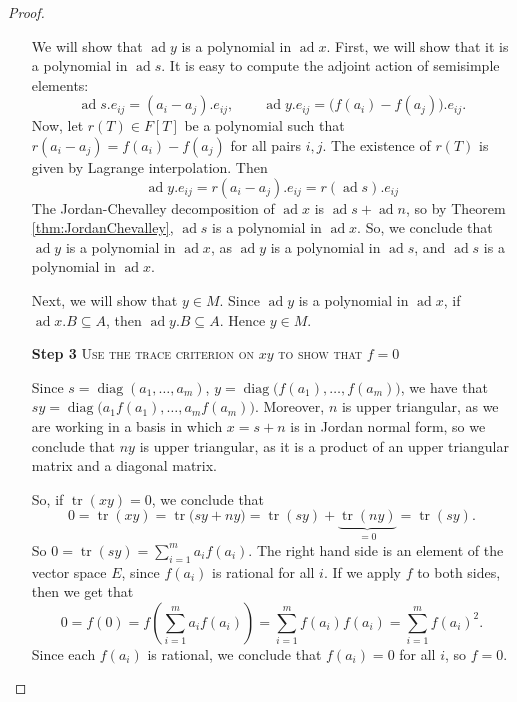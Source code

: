 \documentclass{article}
\DeclareMathOperator{\tr}{tr}
\DeclareMathOperator{\diag}{diag}
\newcommand*\ad{\operatorname{ad}}
\newcommand*\acts{.}
\begin{document}
\begin{proof}
\begin{itemize}
            We will show that $\ad y$ is a polynomial in $\ad x$.
            First, we will show that it is a polynomial in $\ad s$.
            It is easy to compute the adjoint action of semisimple elements:
            \[
                \ad s \acts e_{ij}
                =
                (a_i - a_j) \acts e_{ij}, \qquad
                \ad y \acts e_{ij}
                =
                \big(f(a_i) - f(a_j)\big) \acts e_{ij}.
            \]
            Now, let $r(T) \in F[T]$ be a polynomial such that $r(a_i-a_j) = f(a_i)-f(a_j)$ for all pairs $i, j$.
            The existence of $r(T)$ is given by Lagrange interpolation.
            Then
            \[
                \ad y \acts e_{ij}
                =
                r(a_i-a_j) \acts e_{ij}
                =
                r(\ad s) \acts e_{ij}
            \]
            The Jordan-Chevalley decomposition of $\ad x$ is $\ad s + \ad n$, so by Theorem \ref{thm:JordanChevalley}, $\ad s$ is a polynomial in $\ad x$.
            So, we conclude that $\ad y$ is a polynomial in $\ad x$, as $\ad y$ is a polynomial in $\ad s$, and $\ad s$ is a polynomial in $\ad x$.

            Next, we will show that $y \in M$.
            Since $\ad y$ is a polynomial in $\ad x$, if $\ad x.B \subseteq A$, then $\ad y.B \subseteq A$.
            Hence $y \in M$.

        \item[\textbf{Step 3}]
            \textsc{\color{Crimson} Use the trace criterion on $xy$ to show that $f = 0$}

            Since $s = \diag(a_1,\ldots,a_m)$, $y = \diag\big(f(a_1),\ldots,f(a_m)\big)$, we have that $sy = \diag\big(a_1f(a_1),\ldots,a_mf(a_m)\big)$.
            Moreover, $n$ is upper triangular, as we are working in a basis in which $x = s+n$ is in Jordan normal form, so we conclude that $ny$ is upper triangular, as it is a product of an upper triangular matrix and a diagonal matrix.

            So, if $\tr(xy) = 0$, we conclude that 
            \[
                0
                =
                \tr(xy)
                =
                \tr\big(sy + ny\big)
                =
                \tr(sy) + \underbrace{\tr(ny)}_{=0}
                =
                \tr(sy).
            \]
            So $0 = \tr(sy) = \sum_{i=1}^m a_if(a_i)$.
            The right hand side is an element of the vector space $E$, since $f(a_i)$ is rational for all $i$.
            If we apply $f$ to both sides, then we get that 
            \[
                0
                =
                f(0)
                =
                f\left(
                    \sum_{i=1}^m
                    a_if(a_i)
                \right)
                =
                \sum_{i=1}^m
                f(a_i)
                f(a_i)
                =
                \sum_{i=1}^mf(a_i)^2.
            \]
            Since each $f(a_i)$ is rational, we conclude that $f(a_i) = 0$ for all $i$, so $f = 0$.
    \end{itemize}
\end{proof}
\end{document}
